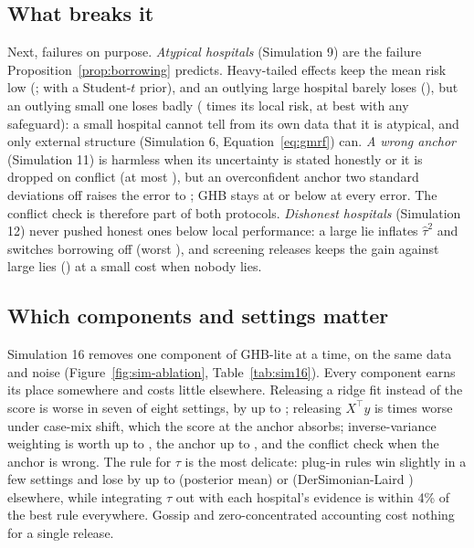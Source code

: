 \subsection{What breaks it}\label{sec:sim-attacks}

Next, failures on purpose. \emph{Atypical hospitals} (Simulation 9) are the failure Proposition~\ref{prop:borrowing} predicts. Heavy-tailed effects keep the mean risk low (\SimNineTGHB; \SimNineTRobust{} with a Student-$t$ prior), and an outlying large hospital barely loses (\SimNineLargeGHB), but an outlying small one loses badly (\SimNineSmallGHB{} times its local risk, at best \SimNineSmallOpt{} with any safeguard): a small hospital cannot tell from its own data that it is atypical, and only external structure (Simulation 6, Equation~\eqref{eq:gmrf}) can. \emph{A wrong anchor} (Simulation 11) is harmless when its uncertainty is stated honestly or it is dropped on conflict (at most \SimElevenHonestMax), but an overconfident anchor two standard deviations off raises the error to \SimElevenOverTwo; GHB stays at or below \SimElevenVMax{} at every error. The conflict check is therefore part of both protocols. \emph{Dishonest hospitals} (Simulation 12) never pushed honest ones below local performance: a large lie inflates $\hat{\tau}^2$ and switches borrowing off (worst \SimTwelveWorstGHB), and screening releases keeps the gain against large lies (\SimTwelveRobustLarge) at a small cost when nobody lies.

\subsection{Which components and settings matter}\label{sec:sim-components}

Simulation 16 removes one component of GHB-lite at a time, on the same data and noise (Figure~\ref{fig:sim-ablation}, Table~\ref{tab:sim16}). Every component earns its place somewhere and costs little elsewhere. Releasing a ridge fit instead of the score is worse in seven of eight settings, by up to \SimSixteenRidgeMax; releasing $X^\top y$ is \SimSixteenXtyShift{} times worse under case-mix shift, which the score at the anchor absorbs; inverse-variance weighting is worth up to \SimSixteenEqualMax, the anchor up to \SimSixteenNoAnchorMax, and the conflict check \SimSixteenNoCheckAnchor{} when the anchor is wrong. The rule for $\tau$ is the most delicate: plug-in rules win slightly in a few settings and lose by up to \SimSixteenTauMeanMax{} (posterior mean) or \SimSixteenTauDLMax{} (DerSimonian-Laird \cite{dersimonian1986meta}) elsewhere, while integrating $\tau$ out with each hospital's evidence is within 4\% of the best rule everywhere. Gossip and zero-concentrated accounting cost nothing for a single release.


